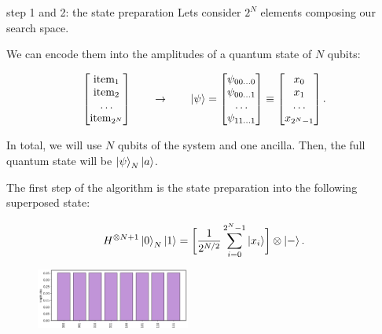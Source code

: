 \documentclass[aspectratio=169, 8pt, xcolor={svgnames}, hyperref={linkcolor=black}]{beamer}
\begin{document}
\begin{frame}{step 1 and 2: the state preparation}
Lets consider $2^N$ elements composing our search space. \pause

We can encode them into the amplitudes of a quantum state of $N$ qubits: 

$$ 
\begin{bmatrix}
\text{item}_1 \\
\text{item}_2 \\
\dots \\
\text{item}_{2^N}
\end{bmatrix} \qquad \to \qquad 
\ket{\psi} = \begin{bmatrix}
\psi_{00 \dots 0} \\
\psi_{00 \dots 1}  \\
\dots \\
\psi_{11 \dots 1}
\end{bmatrix}  
\equiv 
\begin{bmatrix}
x_0 \\
x_1  \\
\dots \\
x_{2^N-1}
\end{bmatrix} . 
$$
\pause 


In total, we will use $N$ qubits of the system and 
one ancilla. Then, the full quantum state will be $\ket{\psi}_N \ket{a}$. \pause

The first step of the algorithm is the state preparation into the following superposed state:
\begin{multicols}{2}
$$ H^{\otimes N + 1} \ket{0}_N \ket{1} = \biggl[ \frac{1}{2^{N/2}}\sum_{i=0}^{2^N - 1} \ket{x_i} \biggr] \otimes \ket{-}. $$

\begin{figure}
   \includegraphics[width=0.45\textwidth]{figures/state1.png}
\end{figure}
\end{multicols}

\end{frame}
\end{document}
